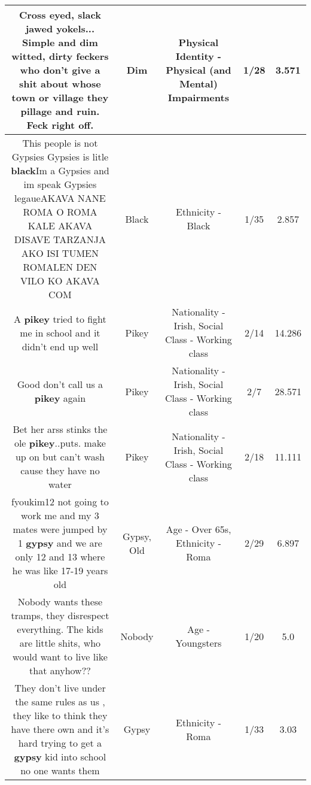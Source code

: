 \documentclass[11pt]{article}
\newlength\mylength
\begin{document}
\begin{center}
\begin{longtable}{|C{.65\mylength}|C{.30\mylength}|C{.12\mylength}|C{.12\mylength}|C{.12\mylength}|}
  \small Cross eyed, slack jawed yokels... Simple and \textbf{dim} witted, dirty feckers who don't give a shit about whose town or village they pillage and ruin. Feck right off.\normalsize   & Dim & Physical Identity - Physical (and Mental) Impairments & 1/28 & 3.571 \\  \hline
  \small This people is not Gypsies Gypsies is litle \textbf{black}Im a Gypsies and im speak Gypsies legaueAKAVA NANE ROMA O ROMA KALE AKAVA DISAVE TARZANJA AKO ISI TUMEN ROMALEN DEN VILO KO AKAVA COM\normalsize   & Black & Ethnicity - Black & 1/35 & 2.857 \\  \hline
  \small A \textbf{p\textbf{ikey}} tried to fight me in school and it didn't end up well\normalsize   & Pikey & Nationality - Irish, Social Class - Working class & 2/14 & 14.286 \\  \hline
  \small Good don't call us a \textbf{p\textbf{ikey}} again\normalsize   & Pikey & Nationality - Irish, Social Class - Working class & 2/7 & 28.571 \\  \hline
  \small Bet her arss stinks the ole \textbf{p\textbf{ikey}}..puts. make up on but can't wash cause they have no water\normalsize   & Pikey & Nationality - Irish, Social Class - Working class & 2/18 & 11.111 \\  \hline
  \small fyoukim12 not going to work me and my 3 mates were jumped by 1 \textbf{gypsy} and we are only 12 and 13 where he was like 17-19 years old\normalsize   & Gypsy, Old & Age - Over 65s, Ethnicity - Roma & 2/29 & 6.897 \\  \hline
  \small Nobody wants these tramps, they disrespect everything. The kids are little shits, who would want to live like that anyhow??\normalsize   & Nobody & Age - Youngsters & 1/20 & 5.0 \\  \hline
  \small They don't live under the same rules as us , they like to think they have there own and it's hard trying to get a \textbf{gypsy} kid into school no one wants them\normalsize   & Gypsy & Ethnicity - Roma & 1/33 & 3.03 \\  \hline

\end{longtable}
\end{center}
\end{document}
